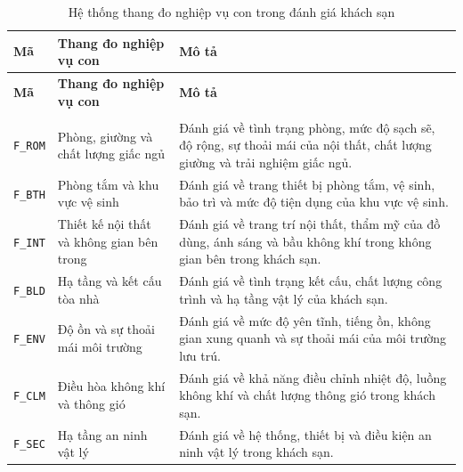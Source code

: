 {\footnotesize
\setlength{\tabcolsep}{4pt}
\renewcommand{\arraystretch}{1.15}

\begin{longtable}{@{}
    >{\centering\arraybackslash}p{1.5cm}
    >{\RaggedRight\arraybackslash}p{4.0cm}
    >{\RaggedRight\arraybackslash}p{10cm}
@{}}
\caption{Hệ thống thang đo nghiệp vụ con trong đánh giá khách sạn}
\label{tab:aspect-measurement-scale} \\

\toprule
\textbf{Mã} &
\textbf{Thang đo nghiệp vụ con} &
\textbf{Mô tả} \\
\midrule
\endfirsthead

\toprule
\textbf{Mã} &
\textbf{Thang đo nghiệp vụ con} &
\textbf{Mô tả} \\
\midrule
\endhead

\midrule
\multicolumn{3}{r}{\textit{Tiếp tục ở trang sau}} \\
\endfoot

\bottomrule
\endlastfoot

\texttt{F\_ROM}
&
Phòng, giường và chất lượng giấc ngủ
&
Đánh giá về tình trạng phòng, mức độ sạch sẽ, độ rộng, sự thoải mái của nội thất, chất lượng giường và trải nghiệm giấc ngủ. \\

\texttt{F\_BTH}
&
Phòng tắm và khu vực vệ sinh
&
Đánh giá về trang thiết bị phòng tắm, vệ sinh, bảo trì và mức độ tiện dụng của khu vực vệ sinh. \\

\texttt{F\_INT}
&
Thiết kế nội thất và không gian bên trong
&
Đánh giá về trang trí nội thất, thẩm mỹ của đồ dùng, ánh sáng và bầu không khí trong không gian bên trong khách sạn. \\

\texttt{F\_BLD}
&
Hạ tầng và kết cấu tòa nhà
&
Đánh giá về tình trạng kết cấu, chất lượng công trình và hạ tầng vật lý của khách sạn. \\

\texttt{F\_ENV}
&
Độ ồn và sự thoải mái môi trường
&
Đánh giá về mức độ yên tĩnh, tiếng ồn, không gian xung quanh và sự thoải mái của môi trường lưu trú. \\

\texttt{F\_CLM}
&
Điều hòa không khí và thông gió
&
Đánh giá về khả năng điều chỉnh nhiệt độ, luồng không khí và chất lượng thông gió trong khách sạn. \\

\texttt{F\_SEC}
&
Hạ tầng an ninh vật lý
&
Đánh giá về hệ thống, thiết bị và điều kiện an ninh vật lý trong khách sạn. \\


\end{longtable}}
